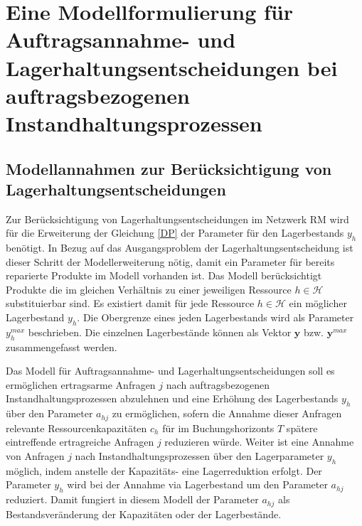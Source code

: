 \chapter{Eine Modellformulierung für Auftragsannahme- und Lagerhaltungsentscheidungen bei auftragsbezogenen Instandhaltungsprozessen}\label{HauptteilDP}
\setcounter{footnote}{86}

\section{Modellannahmen zur Berücksichtigung von Lagerhaltungsentscheidungen}


Zur Berücksichtigung von Lagerhaltungsentscheidungen im Netzwerk RM wird für die Erweiterung der Gleichung \eqref{DP} der Parameter für den Lagerbestands $y_{h}$ benötigt. In Bezug auf das Ausgangsproblem der Lagerhaltungsentscheidung ist dieser Schritt der Modellerweiterung nötig, damit ein Parameter für bereits reparierte Produkte im Modell vorhanden ist. Das Modell berücksichtigt Produkte die im gleichen Verhältnis zu einer jeweiligen Ressource $h\in\mathcal{H}$ substituierbar sind. Es existiert damit für jede Ressource $h\in\mathcal{H}$ ein möglicher Lagerbestand $y_h$. Die Obergrenze eines jeden Lagerbestands wird als Parameter $y_{h}^{max}$ beschrieben. Die einzelnen Lagerbestände können als Vektor $\textbf{y}$ bzw. $\textbf{y}^{max}$ zusammengefasst werden. %


Das Modell für Auftragsannahme- und Lagerhaltungsentscheidungen soll es ermöglichen ertragsarme Anfragen $j$ nach auftragsbezogenen Instandhaltungsprozessen abzulehnen und eine Erhöhung des Lagerbestands $y_{h}$ über den Parameter $a_{hj}$ zu ermöglichen, sofern die Annahme dieser Anfragen relevante Ressourcenkapazitäten $c_{h}$ für im Buchungshorizonts $T$ spätere eintreffende ertragreiche Anfragen $j$ reduzieren würde. Weiter ist eine Annahme von Anfragen $j$ nach Instandhaltungsprozessen über den Lagerparameter $y_{h}$ möglich, indem anstelle der Kapazitäts- eine Lagerreduktion erfolgt. Der Parameter $y_{h}$ wird bei der Annahme via Lagerbestand um den Parameter $a_{hj}$ reduziert. Damit fungiert in diesem Modell der Parameter $a_{hj}$ als Bestandsveränderung der Kapazitäten oder der Lagerbestände. 

